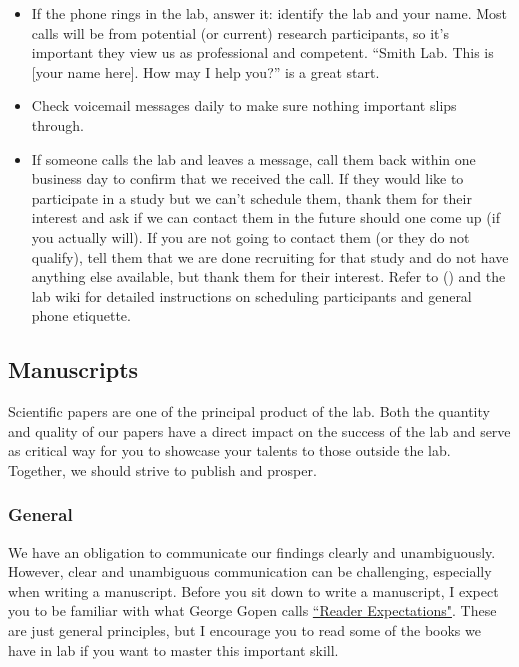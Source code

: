 \documentclass[letterpaper,11pt,oneside]{memoir}
\begin{document}
\begin{itemize}
\item If the phone rings in the lab, answer it: identify the lab and your name. Most calls will be from potential (or current) research participants, so it's important they view us as professional and competent. ``Smith Lab. This is [your name here]. How may I help you?'' is a great start. 
\item Check voicemail messages daily to make sure nothing important slips through.
\item If someone calls the lab and leaves a message, call them back within one business day to confirm that we received the call. If they would like to participate in a study but we can't schedule them, thank them for their interest and ask if we can contact them in the future should one come up (if you actually will). If you are not going to contact them (or they do not qualify), tell them that we are done recruiting for that study and do not have anything else available, but thank them for their interest. Refer to  () and the lab wiki for detailed instructions on scheduling participants and general phone etiquette.

\end{itemize}


\subsection{Manuscripts}
Scientific papers are one of the principal product of the lab. Both the quantity and quality of our papers have a direct impact on the success of the lab and serve as critical way for you to showcase your talents to those outside the lab. Together, we should strive to publish and prosper. 

\subsubsection{General}
\label{sec:ms_general}

We have an obligation to communicate our findings clearly and unambiguously. However, clear and unambiguous communication can be challenging, especially when writing a manuscript. Before you sit down to write a manuscript, I expect you to be familiar with what George Gopen calls \href{https://cseweb.ucsd.edu/~swanson/papers/science-of-writing.pdf}{``Reader Expectations"}. These are just general principles, but I encourage you to read some of the books we have in lab if you want to master this important skill. 
\end{document}
